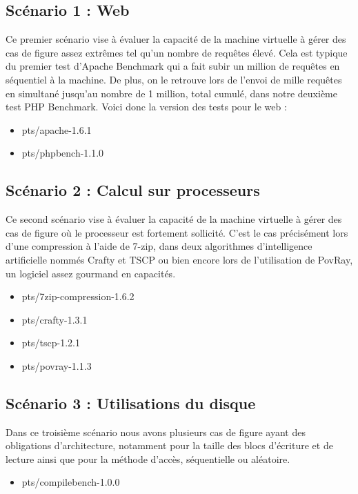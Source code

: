 \subsection{Scénario 1 : Web}
Ce premier scénario vise à évaluer la capacité de la machine virtuelle à gérer des cas de figure assez extrêmes tel qu'un nombre de requêtes élevé. Cela est typique du premier test d'Apache Benchmark qui a fait subir un million de requêtes en séquentiel à la machine. De plus, on le retrouve lors de l'envoi de mille requêtes en simultané jusqu'au nombre de 1 million, total cumulé, dans notre deuxième test PHP Benchmark. Voici donc la version des tests pour le web :   
\begin{itemize}
\item pts/apache-1.6.1
\item pts/phpbench-1.1.0
\end{itemize}

\subsection{Scénario 2 : Calcul sur processeurs}
Ce second scénario vise à évaluer la capacité de la machine virtuelle à gérer des cas de figure où le processeur est fortement sollicité. C'est le cas précisément lors d'une compression à l'aide de 7-zip, dans deux algorithmes d'intelligence artificielle nommés Crafty et TSCP ou bien encore lors de l'utilisation de PovRay, un logiciel assez gourmand en capacités.  
\begin{itemize}
\item pts/7zip-compression-1.6.2
\item pts/crafty-1.3.1
\item pts/tscp-1.2.1
\item pts/povray-1.1.3
\end{itemize}
\subsection{Scénario 3 : Utilisations du disque}
Dans ce troisième scénario nous avons plusieurs cas de figure ayant des obligations d'architecture, notamment pour la taille des blocs d'écriture et de lecture ainsi que pour la méthode d'accès, séquentielle ou aléatoire.   
\begin{itemize}
\item pts/compilebench-1.0.0
\end{itemize}

